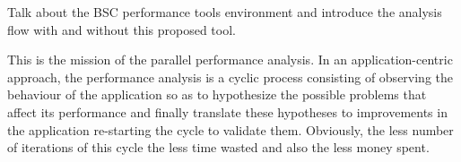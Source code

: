 \documentclass[10pt]{report}
\begin{document}
Talk about the BSC performance tools environment and introduce the analysis flow
with and without this proposed tool.

This is the mission of the parallel performance analysis. In an application-centric
approach, the performance analysis is a cyclic process consisting of observing 
the behaviour of the application so as to hypothesize the possible problems that 
affect its performance and finally translate these hypotheses to improvements in
the application re-starting the cycle to validate them. Obviously, the less number 
of iterations of this cycle the less time wasted and also the less money spent.






\end{document}
